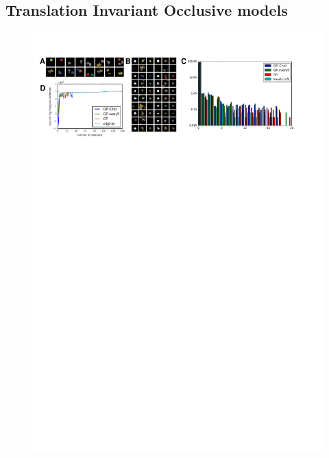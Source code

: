 \subsection{Translation Invariant Occlusive models}

\begin{figure}[t]
\centering

\includegraphics[width=\textwidth]{figs/inveca/invec.pdf}


\end{figure}
